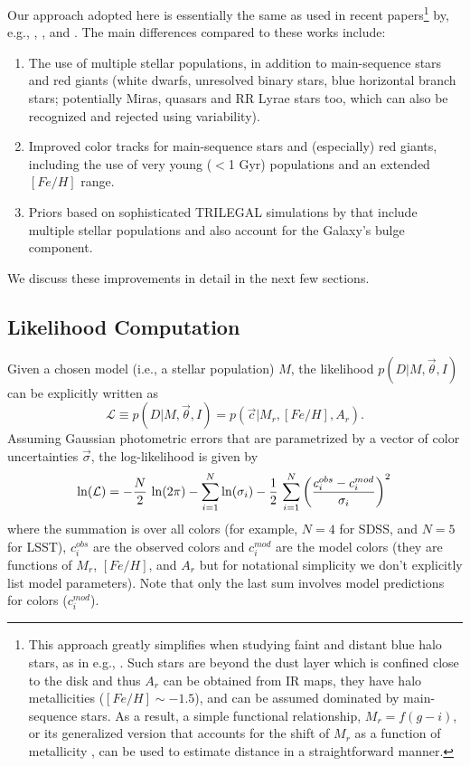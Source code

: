 Our approach adopted here is essentially the same as used in recent papers\footnote{This approach greatly simplifies when studying
faint and distant blue halo stars, as in e.g., \cite{2008ApJ...673..864J}. Such stars are beyond the dust layer which is confined close
to the disk and thus $A_r$ can be obtained from IR maps, they have halo metallicities ($[Fe/H] \sim -1.5$), and can be assumed dominated
by main-sequence stars. As a result, a simple functional relationship, $M_r = f(g-i)$, or its generalized version that
accounts for the shift of $M_r$ as a function of metallicity \citep{2008ApJ...684..287I}, can be used to estimate distance
in a straightforward manner.}
by, e.g., \cite{2011MNRAS.411..435B},  \cite{2014ApJ...783..114G},  \cite{green_3d_2019} and \cite{bailer-jones_estimating_2021}.
The main differences compared to these works include: 
\begin{enumerate}
\item The use of multiple stellar populations, in addition to main-sequence stars and red giants (white dwarfs, unresolved binary stars,
                blue horizontal branch stars; potentially Miras, quasars and RR Lyrae stars too, which can also be recognized and rejected using variability).
\item Improved color tracks for main-sequence stars and (especially) red giants, including the use of very young ($<$1 Gyr) populations 
               and an extended $[Fe/H]$ range. 
\item Priors based on sophisticated TRILEGAL simulations by \cite{2022ApJS..262...22D} that include multiple stellar populations and
               also account for the Galaxy's bulge component. 
\end{enumerate}
             
We discuss these improvements in detail in the next few sections. 


\subsection{Likelihood Computation}

Given a chosen model (i.e., a stellar population) $M$, the likelihood $p(D|M,\vec{\theta},I)$ can be explicitly written as
\begin{equation}
        \mathcal{L} \equiv p(D|M,\vec{\theta},I) = p(\vec{c}|M_r, [Fe/H], A_r).
\end{equation}
Assuming Gaussian photometric errors that are parametrized by a vector of color uncertainties $\vec{\sigma}$,
the log-likelihood is given by
\begin{equation}
   \label{eq:lnLcolors}
   \ln (\mathcal{L}) =  - {N \over 2} \, \ln(2\pi) - \sum_{i=1}^N \ln(\sigma_i) - {1 \over 2} \,\sum_{i=1}^N \left({ c^{obs}_i - c^{mod}_i  \over \sigma_i } \right)^2 \,
\end{equation}
where the summation is over all colors (for example, $N=4$ for SDSS, and $N=5$ for LSST), \ensuremath{c^{obs}_i} are the
observed colors and \ensuremath{c^{mod}_i} are the model colors (they are functions of $M_r$, $[Fe/H]$, and $A_r$
but for notational simplicity we don't explicitly list model parameters). Note that only the last sum involves model predictions
for colors ($c^{mod}_i$).

